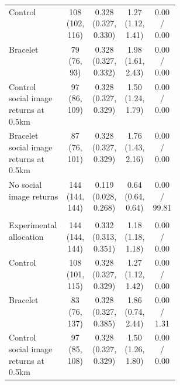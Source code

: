 \begin{longtable}{p{0.34\linewidth}cccc}
Control & \makecell[c]{108\\(102, 116)} & \makecell[c]{0.328\\(0.327, 0.330)} & \makecell[c]{1.27\\(1.12, 1.41)} & 0.00 / 0.00 \\
Bracelet & \makecell[c]{79\\(76, 93)} & \makecell[c]{0.328\\(0.327, 0.332)} & \makecell[c]{1.98\\(1.61, 2.43)} & 0.00 / 0.00 \\
Control social image returns at 0.5km & \makecell[c]{97\\(86, 109)} & \makecell[c]{0.328\\(0.327, 0.329)} & \makecell[c]{1.50\\(1.24, 1.79)} & 0.00 / 0.00 \\
Bracelet social image returns at 0.5km & \makecell[c]{87\\(76, 101)} & \makecell[c]{0.328\\(0.327, 0.329)} & \makecell[c]{1.76\\(1.43, 2.16)} & 0.00 / 0.00 \\
No social image returns & \makecell[c]{144\\(144, 144)} & \makecell[c]{0.119\\(0.028, 0.268)} & \makecell[c]{0.64\\(0.64, 0.64)} & 0.00 / 99.81 \\
\addlinespace
\multicolumn{5}{l}{\textit{Treatment-specific social image weight}} \\
Experimental allocation & \makecell[c]{144\\(144, 144)} & \makecell[c]{0.332\\(0.313, 0.351)} & \makecell[c]{1.18\\(1.18, 1.18)} & 0.00 / 0.00 \\
Control & \makecell[c]{108\\(101, 115)} & \makecell[c]{0.328\\(0.327, 0.329)} & \makecell[c]{1.27\\(1.12, 1.42)} & 0.00 / 0.00 \\
Bracelet & \makecell[c]{83\\(76, 137)} & \makecell[c]{0.328\\(0.327, 0.385)} & \makecell[c]{1.86\\(0.74, 2.44)} & 0.00 / 1.31 \\
Control social image returns at 0.5km & \makecell[c]{97\\(85, 108)} & \makecell[c]{0.328\\(0.327, 0.329)} & \makecell[c]{1.50\\(1.26, 1.80)} & 0.00 / 0.00 \\

\end{longtable}
